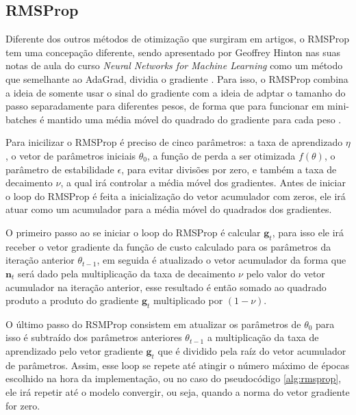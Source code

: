 \subsection{RMSProp}

Diferente dos outros métodos de otimização que surgiram em artigos, o RMSProp tem uma concepação diferente, sendo apresentado por Geoffrey Hinton nas suas notas de aula do curso \textit{Neural Networks for Machine Learning} como um método que semelhante ao AdaGrad, dividia o gradiente \parencite{RMSPropMethod}. Para isso, o RMSProp combina a ideia de somente usar o sinal do gradiente com a ideia de adptar o tamanho do passo separadamente para diferentes pesos, de forma que para funcionar em mini-batches é mantido uma média móvel do quadrado do gradiente para cada peso \parencite{RMSPropMethod}.

Para inicilizar o RMSProp é preciso de cinco parâmetros: a taxa de aprendizado $\eta$, o vetor de parâmetros iniciais $\theta_0$, a função de perda a ser otimizada $f(\theta)$, o parâmetro de estabilidade $\epsilon$, para evitar divisões por zero, e também a taxa de decaimento $\nu$, a qual irá controlar a média móvel dos gradientes. Antes de iniciar o loop do RMSProp é feita a inicialização do vetor acumulador com zeros, ele irá atuar como um acumulador para a média móvel do quadrados dos gradientes.

O primeiro passo ao se iniciar o loop do RMSProp é calcular $\textbf{g}_t$, para isso ele irá receber o vetor gradiente da função de custo calculado para os parâmetros da iteração anterior $\theta_{t-1}$, em seguida é atualizado o vetor acumulador da forma que $\textbf{n}_t$ será dado pela multiplicação da taxa de decaimento $\nu$ pelo valor do vetor acumulador na iteração anterior, esse resultado é então somado ao quadrado produto a produto do gradiente $\textbf{g}_t$ multiplicado por $(1 - \nu)$.

O último passo do RSMProp consistem em atualizar os parâmetros de $\theta_0$ para isso é subtraído dos parâmetros anteriores $\theta_{t-1}$ a multiplicação da taxa de aprendizado pelo vetor gradiente $\textbf{g}_t$ que é dividido pela raíz do vetor acumulador de parâmetros. Assim, esse loop se repete até atingir o número máximo de épocas escolhido na hora da implementação, ou no caso do pseudocódigo \ref{alg:rmsprop}, ele irá repetir até o modelo convergir, ou seja, quando a norma do vetor gradiente for zero.

